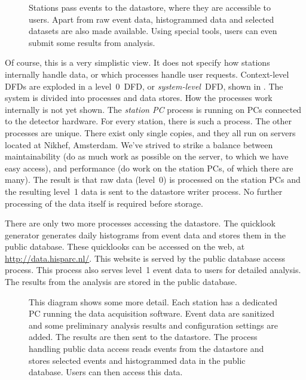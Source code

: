 \begin{figure}
\centering

\caption{
Stations pass events to the datastore, where they are accessible to users.
Apart from raw event data, histogrammed data and selected datasets are
also made available.  Using special tools, users can even submit some
results from analysis.}
\label{fig:dfd-contextlevel}
\end{figure}

Of course, this is a very simplistic view.  It does not specify how stations
internally handle data, or which processes handle user requests.  Context-level
DFDs are exploded in a level~0~DFD, or \emph{system-level}~DFD, shown in
. The system is divided into processes and data stores.
How the processes work internally is not yet shown.  The
\emph{station PC} process is running on PCs connected to the detector
hardware.
For every station, there is such a process.  The other processes are
unique.
There exist only single copies, and they all run on servers located at Nikhef,
Amsterdam.  We've strived to strike a balance between maintainability (do as
much work as possible on the server, to which we have easy access), and
performance (do work on the station PCs, of which there are many).  The result
is that raw data (level~0) is processed on the station PCs and the resulting
level~1 data is sent to the datastore writer process.  No further
processing of the data itself is required before storage.

There are only two more processes accessing the datastore.  The \hisparc
quicklook generator generates daily histograms from event data and stores them
in the public database.  These quicklooks can be accessed on the web, at
\url{http://data.hisparc.nl/}.  This website is served by the public database
access process.  This process also serves level~1 event data to
users for detailed analysis. The results from the analysis are stored in the
public database.

\begin{figure}
\centering

\caption{  This diagram shows some
more detail.  Each station has a dedicated PC running the data acquisition
software.  Event data are sanitized and some preliminary analysis results and
configuration settings are added.  The results are then sent to the datastore.
The process handling public data access reads events from the datastore and
stores selected events and histogrammed data in the public database.  Users can
then access this data.}
\label{fig:dfd-level0}
\end{figure}


